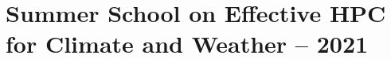 \chapter{Summer School on Effective HPC for Climate and Weather -- 2021}
\label{ch:ss2021}

\begin{comment}

\title{}

\section{}

\subsection{Registration}
\label{sec:registration}

The applicants also had to choose between two main packages representing the fee structure of the event:

\textbf{The Full Package Registration: £800}

\begin{itemize}

\item Registration in the event Mailing List
\item Attendance to all sessions and social events
\item Accommodation on university premises (Check Section Accommodation)
\item All-inclusive meals (breakfast, lunch, and three-course self-service dinner with tea and coffee)
\item Transport between London Heathrow Airport and the venue (by bus)

\end{itemize}

\textbf{The Minimal Registration: £350}

\begin{itemize}

\item Registration in the event Mailing List
\item Attendance to all sessions and social events
\item Lunch

\end{itemize}

\subsection{Funding of Attendees}
\label{sec:funding}


\end{comment}
